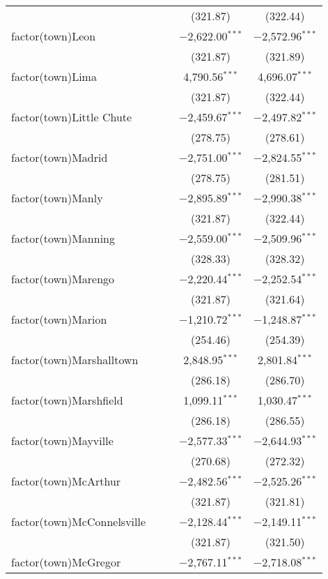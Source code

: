 \begin{table}[!htbp]
\begin{tabular}{@{\extracolsep{5pt}}lcccc}
  &  &  & (321.87) & (322.44) \\ 
  factor(town)Leon &  &  & $-$2,622.00$^{***}$ & $-$2,572.96$^{***}$ \\ 
  &  &  & (321.87) & (321.89) \\ 
  factor(town)Lima &  &  & 4,790.56$^{***}$ & 4,696.07$^{***}$ \\ 
  &  &  & (321.87) & (322.44) \\ 
  factor(town)Little Chute &  &  & $-$2,459.67$^{***}$ & $-$2,497.82$^{***}$ \\ 
  &  &  & (278.75) & (278.61) \\ 
  factor(town)Madrid &  &  & $-$2,751.00$^{***}$ & $-$2,824.55$^{***}$ \\ 
  &  &  & (278.75) & (281.51) \\ 
  factor(town)Manly &  &  & $-$2,895.89$^{***}$ & $-$2,990.38$^{***}$ \\ 
  &  &  & (321.87) & (322.44) \\ 
  factor(town)Manning &  &  & $-$2,559.00$^{***}$ & $-$2,509.96$^{***}$ \\ 
  &  &  & (328.33) & (328.32) \\ 
  factor(town)Marengo &  &  & $-$2,220.44$^{***}$ & $-$2,252.54$^{***}$ \\ 
  &  &  & (321.87) & (321.64) \\ 
  factor(town)Marion &  &  & $-$1,210.72$^{***}$ & $-$1,248.87$^{***}$ \\ 
  &  &  & (254.46) & (254.39) \\ 
  factor(town)Marshalltown &  &  & 2,848.95$^{***}$ & 2,801.84$^{***}$ \\ 
  &  &  & (286.18) & (286.70) \\ 
  factor(town)Marshfield &  &  & 1,099.11$^{***}$ & 1,030.47$^{***}$ \\ 
  &  &  & (286.18) & (286.55) \\ 
  factor(town)Mayville &  &  & $-$2,577.33$^{***}$ & $-$2,644.93$^{***}$ \\ 
  &  &  & (270.68) & (272.32) \\ 
  factor(town)McArthur &  &  & $-$2,482.56$^{***}$ & $-$2,525.26$^{***}$ \\ 
  &  &  & (321.87) & (321.81) \\ 
  factor(town)McConnelsville &  &  & $-$2,128.44$^{***}$ & $-$2,149.11$^{***}$ \\ 
  &  &  & (321.87) & (321.50) \\ 
  factor(town)McGregor &  &  & $-$2,767.11$^{***}$ & $-$2,718.08$^{***}$ \\ 

\end{tabular}
\end{table}
